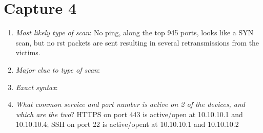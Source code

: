 \documentclass{article}
\begin{document}
\section{Capture 4}
\begin{enumerate}
	\item {\em Most likely type of scan}: No ping, along the top 945 ports, looks like a SYN scan,
		but no rst packets are sent resulting in several
		retransmissions from the victims.
	\item {\em Major clue to type of scan}:
	\item {\em Exact syntax}:
	\item {\em What common service and port number is
		active on 2 of the devices, and which are
		the two}? HTTPS on port 443 is active/open
		at 10.10.10.1 and 10.10.10.4; SSH on port
		22 is active/opent at 10.10.10.1 and
		10.10.10.2
\end{enumerate}
\end{document}
